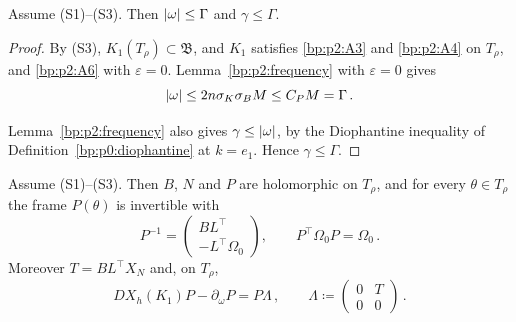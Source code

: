 
\begin{lemma}\label{bp:p3:frequency-bound}
Assume (S1)--(S3). Then $\lvert \omega\rvert\le\Gamma$ and $\gamma\le\Gamma$.
\end{lemma}

\begin{proof}
\label{step:p3:frequency-omega}
By (S3), $K_1(T_\rho)\subset\mathfrak B$, and $K_1$ satisfies \ref{bp:p2:A3} and \ref{bp:p2:A4} on $T_\rho$,
and \ref{bp:p2:A6} with $\varepsilon=0$. Lemma~\ref{bp:p2:frequency} with $\varepsilon=0$ gives
\begin{equation*}
\lvert \omega\rvert\le2n\sigma_K\sigma_BM\le C_PM=\Gamma\,.
\end{equation*}

\label{step:p3:frequency-gamma}
Lemma~\ref{bp:p2:frequency} also gives $\gamma\le\lvert \omega\rvert$, by the Diophantine inequality of
Definition~\ref{bp:p0:diophantine} at $k=e_1$. Hence $\gamma\le\Gamma$.
\end{proof}

\begin{lemma}\label{bp:p3:reducibility}
Assume (S1)--(S3). Then $B$, $N$ and $P$ are holomorphic on $T_\rho$, and for every $\theta\in T_\rho$
the frame $P(\theta)$ is invertible with
\begin{equation*}
P^{-1}=\begin{pmatrix}BL^\top\\-L^\top\Omega_0\end{pmatrix},\qquad P^\top\Omega_0P=\Omega_0\,.
\end{equation*}
Moreover $T=BL^\top X_N$ and, on $T_\rho$,
\begin{equation*}
DX_h(K_1)P-\partial_\omega P=P\Lambda\,,\qquad\Lambda\coloneqq\begin{pmatrix}0&T\\0&0\end{pmatrix}\,.
\end{equation*}
\end{lemma}

